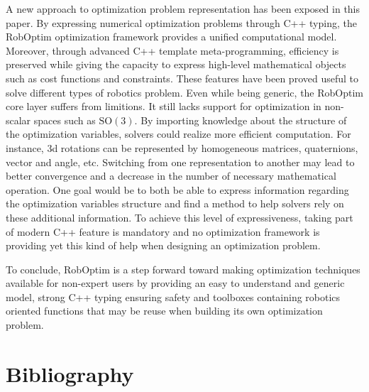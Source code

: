 \documentclass[conference,final,a4paper,twocolumn,9pt]{IEEEtran}
\begin{document}
A new approach to optimization problem representation has been exposed
in this paper. By expressing numerical optimization problems through
C++ typing, the RobOptim optimization framework provides a unified
computational model. Moreover, through advanced C++ template
meta-programming, efficiency is preserved while giving the capacity to
express high-level mathematical objects such as cost functions and
constraints. These features have been proved useful to solve different
types of robotics problem. Even while being generic, the RobOptim core
layer suffers from limitions. It still lacks support for optimization
in non-scalar spaces such as $\text{SO}(3)$. By importing knowledge
about the structure of the optimization variables, solvers could
realize more efficient computation. For instance, 3d rotations can be
represented by homogeneous matrices, quaternions, vector and angle,
etc. Switching from one representation to another may lead to better
convergence and a decrease in the number of necessary mathematical
operation. One goal would be to both be able to express information
regarding the optimization variables structure and find a method to
help solvers rely on these additional information. To achieve this
level of expressiveness, taking part of modern C++ feature is
mandatory and no optimization framework is providing yet this kind of
help when designing an optimization problem.


To conclude, RobOptim is a step forward toward making optimization
techniques available for non-expert users by providing an easy to
understand and generic model, strong C++ typing ensuring safety and
toolboxes containing robotics oriented functions that may be reuse
when building its own optimization problem.


\section{Bibliography}\label{sec:bibliography}

\end{document}
